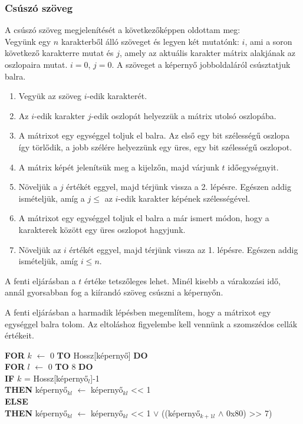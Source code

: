 \documentclass[a4paper, 12pt]{article}
\begin{document}
\subsubsection{Csúszó szöveg} \label{csuszo}
A csúszó szöveg megjelenítését a következőképpen oldottam meg:\\
Vegyünk egy $n$ karakterből álló szöveget és legyen két mutatónk: $i$, ami a soron következő karakterre mutat és $j$, amely az aktuális karakter mátrix alakjának az oszlopaira mutat. $i = 0$, $j = 0$.
A szöveget a képernyő jobboldaláról csúsztatjuk balra.
\begin{enumerate}
	\item Vegyük az szöveg $i$-edik karakterét.
	\item Az $i$-edik karakter $j$-edik oszlopát helyezzük a mátrix utolsó oszlopába.
	\item A mátrixot egy egységgel toljuk el balra. Az első egy bit szélességű oszlopa így törlődik, a jobb szélére helyezzünk egy üres, egy bit szélességű oszlopot.
	\item A mátrix képét jelenítsük meg a kijelzőn, majd várjunk $t$ időegységnyit.
	\item Növeljük a $j$ értékét eggyel, majd térjünk vissza a 2. lépésre. Egészen addig ismételjük, amíg a $j \leq$ az $i$-edik karakter képének szélességével.
	\item A mátrixot egy egységgel toljuk el balra a már ismert módon, hogy a karakterek között egy üres oszlopot hagyjunk.
	\item Növeljük az $i$ értékét eggyel, majd térjünk vissza az 1. lépésre. Egészen addig ismételjük, amíg $i \leq n$.
\end{enumerate}

A fenti eljárásban a $t$ értéke tetszőleges lehet. Minél kisebb a várakozási idő, annál gyorsabban fog a kiírandó szöveg csúszni a képernyőn.

A fenti eljárásban a harmadik lépésben megemlítem, hogy a mátrixot egy egységgel balra tolom. Az eltoláshoz figyelembe kell vennünk a szomszédos cellák értékeit.

\bigskip

\bigskip

\noindent\textbf{FOR} $k$ $\leftarrow$ 0 \textbf{TO} Hossz[képernyő] \textbf{DO}\\
\indent \textbf{FOR} $l$ $\leftarrow$ 0 \textbf{TO} 8 \textbf{DO}\\
\indent \indent \textbf{IF} $k$ = Hossz[képernyő$_l$]-1\\
\indent \indent \indent \textbf{THEN} képernyő$_{kl}$ $\leftarrow$ képernyő$_{kl}$ << 1\\
\indent \indent \textbf{ELSE}\\
\indent \indent \indent \textbf{THEN} képernyő$_{kl}$ $\leftarrow$ képernyő$_{kl}$ << 1 $\lor$ ((képernyő$_{k+1l}$ $\land$ 0x80) >> 7)
\end{document}
